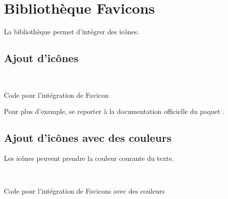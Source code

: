 \chapter{Bibliothèque Favicons} \label{Fonts}

La bibliothèque  permet d'intégrer des icônes.

\section{Ajout d'icônes}

\faviconGithub~
\faviconCheck~
\faviconBookmark~
\faviconLeaf~
\faviconFile~
\faviconGear~
\faviconClose~
\faviconWarning~
\faviconInfo~
\faviconSearch~
\faviconLink~
\faviconClock~
\faviconChat~
\faviconSymbolicLink


\begin{Latex}{Code pour l'intégration de Favicon}
\faviconGithub~
\faviconCheck~
\faviconBookmark~
\faviconLeaf~
\faviconFile~
\faviconGear~
\faviconClose~
\faviconWarning~
\faviconInfo~
\faviconSearch~
\faviconLink~
\faviconClock~
\faviconChat~
\faviconSymbolicLink
\end{Latex}

Pour plus d'exemple, se reporter à la documentation officielle du paquet .

\section{Ajout d'icônes avec des couleurs}

Les icônes peuvent prendre la couleur courante du texte.

~~ \newpage

\begin{Latex}{Code pour l'intégration de Favicons avec des couleurs}
~~ 
\end{Latex}

